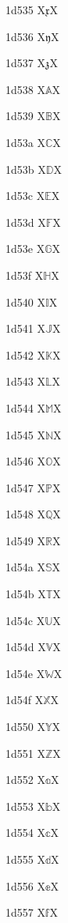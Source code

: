 \documentclass[11pt]{article}
\begin{document}
1d535 X{\ensuremath{\mathfrak{x}}}X

1d536 X{\ensuremath{\mathfrak{y}}}X

1d537 X{\ensuremath{\mathfrak{z}}}X

1d538 X{\ensuremath{\mathbb{A}}}X

1d539 X{\ensuremath{\mathbb{B}}}X

1d53a X{\ensuremath{\mathbb{C}}}X

1d53b X{\ensuremath{\mathbb{D}}}X

1d53c X{\ensuremath{\mathbb{E}}}X

1d53d X{\ensuremath{\mathbb{F}}}X

1d53e X{\ensuremath{\mathbb{G}}}X

1d53f X{\ensuremath{\mathbb{H}}}X

1d540 X{\ensuremath{\mathbb{I}}}X

1d541 X{\ensuremath{\mathbb{J}}}X

1d542 X{\ensuremath{\mathbb{K}}}X

1d543 X{\ensuremath{\mathbb{L}}}X

1d544 X{\ensuremath{\mathbb{M}}}X

1d545 X{\ensuremath{\mathbb{N}}}X

1d546 X{\ensuremath{\mathbb{O}}}X

1d547 X{\ensuremath{\mathbb{P}}}X

1d548 X{\ensuremath{\mathbb{Q}}}X

1d549 X{\ensuremath{\mathbb{R}}}X

1d54a X{\ensuremath{\mathbb{S}}}X

1d54b X{\ensuremath{\mathbb{T}}}X

1d54c X{\ensuremath{\mathbb{U}}}X

1d54d X{\ensuremath{\mathbb{V}}}X

1d54e X{\ensuremath{\mathbb{W}}}X

1d54f X{\ensuremath{\mathbb{X}}}X

1d550 X{\ensuremath{\mathbb{Y}}}X

1d551 X{\ensuremath{\mathbb{Z}}}X

1d552 X{\ensuremath{\mathbb{a}}}X

1d553 X{\ensuremath{\mathbb{b}}}X

1d554 X{\ensuremath{\mathbb{c}}}X

1d555 X{\ensuremath{\mathbb{d}}}X

1d556 X{\ensuremath{\mathbb{e}}}X

1d557 X{\ensuremath{\mathbb{f}}}X
\end{document}
